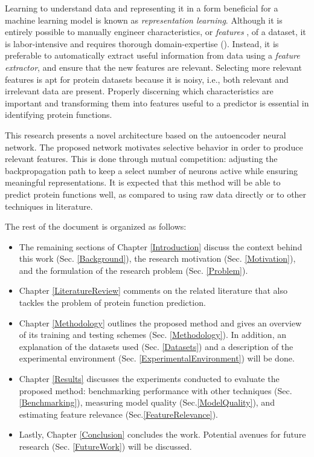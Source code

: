 \par Learning to understand data and representing it in a form beneficial for a
machine learning model is known as \textit{representation learning}. Although
it is entirely possible to manually engineer characteristics, or \textit{features}
, of a dataset, it is labor-intensive and requires thorough domain-expertise 
(\cite{bengio2013representation}).  Instead, it is preferable to automatically
extract useful information from data using a \textit{feature extractor}, and
ensure that the new features are relevant. Selecting more relevant features is
apt for protein datasets because it is noisy, i.e., both relevant and irrelevant
data are present. Properly discerning which characteristics are important and 
transforming them into features useful to a predictor is essential in
identifying protein functions.

\par This research presents a novel architecture based on the autoencoder neural
network. The proposed network motivates selective behavior in order to produce
relevant features. This is done through mutual competition: adjusting the
backpropagation path to keep a select number of neurons active while ensuring
meaningful representations. It is expected that this method will be able to
predict protein functions well, as compared to using raw data directly or to
other techniques in literature. 

\newpage

\par \noindent The rest of the document is organized as follows:

\begin{itemize} 
    \item The remaining sections of Chapter \ref{Introduction}
        discuss the context behind this work (Sec. \ref{Background}), the
        research motivation (Sec. \ref{Motivation}), and the formulation of the
        research problem (Sec. \ref{Problem}).  
    \item Chapter \ref{LiteratureReview} comments on the related literature
        that also tackles the problem of protein function prediction. 
    \item Chapter \ref{Methodology} outlines the proposed method
        and gives an overview of its training and testing schemes (Sec. 
        \ref{Methodology}). In addition, an explanation of the datasets used (Sec.
        \ref{Datasets}) and a description of the experimental environment
        (Sec. \ref{ExperimentalEnvironment}) will be done. 
    \item Chapter \ref{Results} discusses the experiments conducted to evaluate the 
        proposed method: benchmarking performance with other techniques 
        (Sec. \ref{Benchmarking}), measuring model quality (Sec.\ref{ModelQuality}),
        and estimating feature relevance (Sec.\ref{FeatureRelevance}).
    \item Lastly, Chapter \ref{Conclusion} concludes the work. Potential avenues for 
        future research (Sec. \ref{FutureWork}) will be discussed.
\end{itemize}


